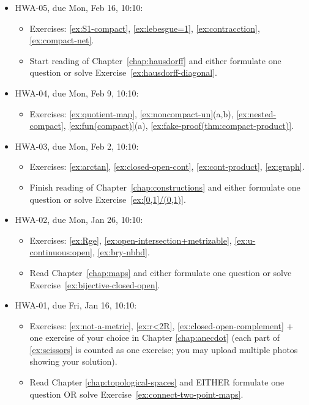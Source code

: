 \begin{itemize}
\item HWA-05, due Mon, Feb 16, 10:10:
\begin{itemize}
\item Exercises:
\ref{ex:S1-compact},
\ref{ex:lebesgue=1},
\ref{ex:contracction},
\ref{ex:compact-net}.
\item Start reading of Chapter~\ref{chap:hausdorff} and either formulate one question or solve Exercise~\ref{ex:hausdorff-diagonal}.
\end{itemize}

\item HWA-04, due Mon, Feb 9, 10:10:
\begin{itemize}
\item Exercises:
\ref{ex:quotient-map},
\ref{ex:noncompact-un}(a,b),
\ref{ex:nested-compact},
\ref{ex:fun(compact)}(a),
\ref{ex:fake-proof(thm:compact-product)}.
\end{itemize}

\item HWA-03, due Mon, Feb 2, 10:10:
\begin{itemize}
\item Exercises:
\ref{ex:arctan},
\ref{ex:closed-open-cont},
\ref{ex:cont-product},
\ref{ex:graph}.
\item Finish reading of Chapter~\ref{chap:constructions} and either formulate one question or solve Exercise~\ref{ex:[0,1]/(0,1)}.
\end{itemize}

\item HWA-02, due Mon, Jan 26, 10:10:
\begin{itemize}
\item Exercises:
\ref{ex:Rge},
\ref{ex:open-intersection+metrizable},
\ref{ex:u-continuous:open},
\ref{ex:bry-nbhd}.
\item Read Chapter~\ref{chap:maps} and either formulate one question or solve Exercise~\ref{ex:bijective-closed-open}.
\end{itemize}

\item HWA-01, due Fri, Jan 16, 10:10:
\begin{itemize}
\item Exercises:
\ref{ex:not-a-metric},
\ref{ex:r<2R},
\ref{ex:closed-open-complement} + one exercise of your choice in Chapter \ref{chap:anecdot} (each part of \ref{ex:scissors} is counted as one exercise; you may upload multiple photos showing your solution).
\item Read Chapter \ref{chap:topological-spaces} and EITHER formulate one question OR solve Exercise~\ref{ex:connect-two-point-maps}.
\end{itemize}

\end{itemize}

